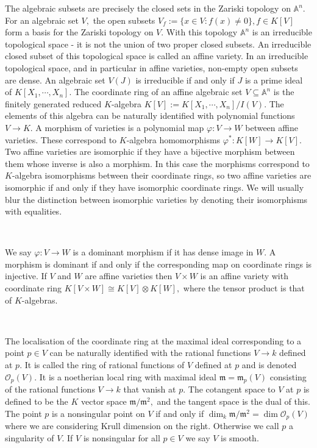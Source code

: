 \documentclass[BSc]{usydthesis}
\numberwithin{equation}{chapter}
\theoremstyle{remark}
\begin{document}
The algebraic subsets are precisely the closed sets in the Zariski topology on $\mathbb{A}^n.$ For an algebraic set $V,$ the open subsets $V_f := \{ x\in V : f(x)\neq 0 \}, f\in K[V]$ form a basis for the Zariski topology on $V.$ With this topology $\mathbb{A}^n$ is an irreducible topological space - it is not the union of two proper closed subsets. An irreducible closed subset of this topological space is called an affine variety. In an irreducible topological space, and in particular in affine varieties, non-empty open subsets are dense. An algebraic set $V(J)$ is irreducible if and only if $J$ is a prime ideal of $K[X_1,\cdots, X_n].$ The coordinate ring of an affine algebraic set $V\subseteq \mathbb{A}^n$ is the finitely generated reduced $K$-algebra $K[V]:= K[X_1,\cdots, X_n]/I(V).$ The elements of this algebra can be naturally identified with polynomial functions $V\to K.$ A morphism of varieties is a polynomial map $\varphi:V\to W$ between affine varieties. These correspond to $K$-algebra homomorphisms $\varphi^*: K[W] \to K[V].$ Two affine varieties are isomorphic if they have a bijective morphism between them whose inverse is also a morphism. In this case the morphisms correspond to $K$-algebra isomorphisms between their coordinate rings, so two affine varieties are isomorphic if and only if they have isomorphic coordinate rings. We will usually blur the distinction between isomorphic varieties by denoting their isomorphisms with equalities. 

~

We say $\varphi:V\to W$ is a dominant morphism if it has dense image in $W.$ A morphism is dominant if and only if the corresponding map on coordinate rings is injective. If $V$ and $W$ are affine varieties then $V\times W$ is an affine variety with coordinate ring $K[V\times W] \cong K[V] \otimes K[W],$ where the tensor product is that of $K$-algebras.

~

The localisation of the coordinate ring at the maximal ideal corresponding to a point $p\in V$ can be naturally identified with the rational functions $V\to k$ defined at $p.$ It is called the ring of rational functions of $V$ defined at $p$ and is denoted $\mathcal{O}_p (V).$ It is a noetherian local ring with maximal ideal $\mathfrak{m}=\mathfrak{m}_p (V)$ consisting of the rational functions $V\to k$ that vanish at $p.$ The cotangent space to $V$ at $p$ is defined to be the $K$ vector space $\mathfrak{m}/\mathfrak{m}^2,$ and the tangent space is the dual of this. The point $p$ is a nonsingular point on $V$ if and only if $\dim_k \mathfrak{m}/\mathfrak{m}^2 = \dim \mathcal{O}_p (V)$ where we are considering Krull dimension on the right. Otherwise we call $p$ a singularity of $V.$ If $V$ is nonsingular for all $p\in V$ we say $V$ is smooth. 
\end{document}
